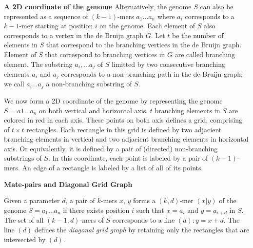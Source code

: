 \documentclass[a4paper]{article}
\begin{document}
\noindent
\textbf{A 2D coordinate of the genome}
Alternatively, the genome $S$ can also be represented as a sequence of $(k-1)$-mers $a_1\ldots a_n$ where 
$a_i$ corresponds to a $k-1$-mer starting at position $i$ on the genome. 
Each element of $S$ also corresponds to a vertex in the de Bruijn graph $G$. 
Let $t$ be the number of elements in $S$ that correspond to the branching vertices in the
de Bruijn graph. Element of $S$ that correspond to branching vertices in $G$ are called branching element. 
The substring $a_i, \ldots a_j$ of $S$ limitted by two consecutive branching 
elements $a_i$ and $a_j$ corresponds to a non-branching path in the de Bruijn graph; we call 
$a_i\ldots a_j$ a non-branching substring of $S$.

We now form a 2D coordinate of the genome by representing the genome $S=a1\ldots a_n$ on
both vertical and horizontal axis. $t$ branching elements 
in $S$ are colored in red in each axis. These points on both axis defines a grid, 
comprising of $t\times t$ rectangles. Each rectangle in this grid is defined by two adjacient branching 
elements in vertical and two adjacient branching elements in horizontal axis. 
Or equivalently, it is defined by a pair of (directed) non-branching substrings of $S$.    
In this coordinate, each point is labeled by a pair of $(k-1)$-mers. An edge of a rectangle is labeled 
by a list of all of its points.  

\noindent
\textbf{Mate-pairs and Diagonal Grid Graph}

Given a parameter $d$, a pair of $k$-mers $x$, $y$ forms a $(k,d)$-mer $(x|y)$  %
of the genome $S = a_1\ldots a_n$ if there exists position $i$ such that $x=a_i$ and 
$y = a_{i+d}$ in $S$. The set of all $(k-1,d)$-mers of $S$ corresponds to a line $(d): y = x+d$.
The line $(d)$ defines the \emph{diagonal grid graph} by retaining only the rectangles that 
are intersected by $(d)$. 
\end{document}
